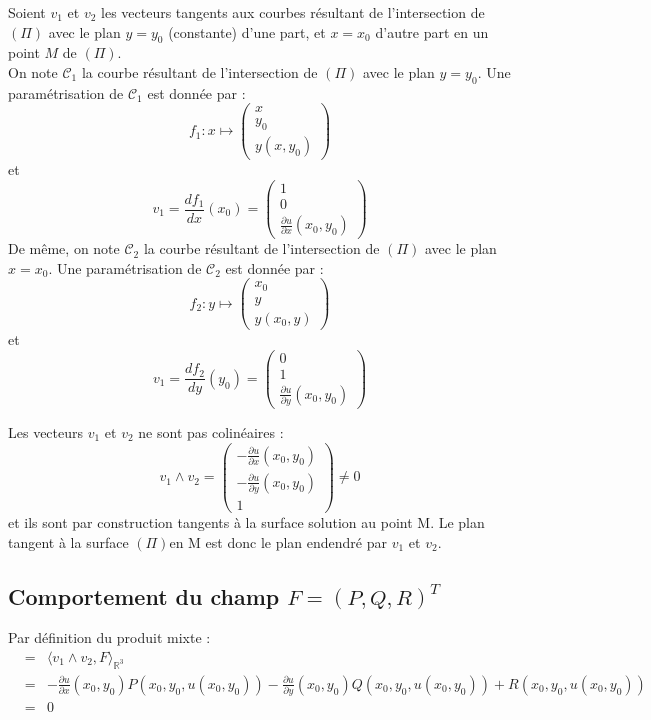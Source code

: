Soient $v_1$ et $v_2$ les vecteurs tangents aux courbes résultant de l'intersection de $(\Pi)$ avec le plan $y=y_0$ (constante) d'une part, et $x=x_0$ d'autre part en un point $M$ de $(\Pi)$.\\
On note $\mathcal{C}_1$ la courbe résultant de l'intersection de $(\Pi)$ avec le plan $y=y_0$. Une paramétrisation de $\mathcal{C}_1$ est donnée par :
	\[f_1:x\mapsto\begin{pmatrix} x\\y_0\\y(x,y_0)\end{pmatrix}\]
et \[v_1=\frac{df_1}{dx}(x_0)=\begin{pmatrix}1\\0\\\frac{\partial u}{\partial x}(x_0,y_0)\end{pmatrix}\]
De même, on note $\mathcal{C}_2$ la courbe résultant de l'intersection de $(\Pi)$ avec le plan $x=x_0$. Une paramétrisation de $\mathcal{C}_2$ est donnée par :
	\[f_2:y\mapsto\begin{pmatrix} x_0\\y\\y(x_0,y)\end{pmatrix}\]
et \[v_1=\frac{df_2}{dy}(y_0)=\begin{pmatrix}0\\1\\\frac{\partial u}{\partial y}(x_0,y_0)\end{pmatrix}\]

Les vecteurs $v_1$ et $v_2$ ne sont pas colinéaires : 
	\[v_1\wedge v_2=\begin{pmatrix} -\frac{\partial u}{\partial x} (x_0, y_0) \\ -\frac{\partial u}{\partial y}(x_0, y_0) \\ 1 \end{pmatrix} \neq 0\]
et ils sont par construction tangents à la surface solution au point M. Le plan tangent à la surface $(\Pi)$en M est donc le plan endendré par $v_1$ et $v_2$.

\subsection{Comportement du champ $F= (P,Q,R)^T$}
Par définition du produit mixte :
\begin{eqnarray*}
	[v_1,v_2,F]&=&\langle v_1\wedge v_2, F\rangle_{\mathbb{R}^3}\\
		&=&-\frac{\partial u}{\partial x}(x_0,y_0)P(x_0,y_0,u(x_0,y_0)) - \frac{\partial u}{\partial y}(x_0,y_0)Q(x_0,y_0,u(x_0,y_0))+R(x_0,y_0,u(x_0,y_0))\\
		&=&0
\end{eqnarray*}

